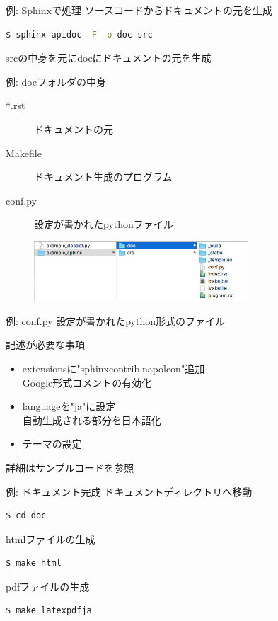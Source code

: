 \documentclass[12pt, xetex, xcolor=pdftex, dvipsnames]{beamer}
\begin{document}
\begin{frame}[fragile]{例: Sphinxで処理}
    ソースコードからドキュメントの元を生成

    \begin{lstlisting}[language=Bash]
$ sphinx-apidoc -F -o doc src
    \end{lstlisting}

    srcの中身を元にdocにドキュメントの元を生成
\end{frame}
\begin{frame}{例: docフォルダの中身}
    \begin{description}
        \item[*.rst] ドキュメントの元
        \item[Makefile] ドキュメント生成のプログラム
        \item[conf.py] 設定が書かれたpythonファイル
    \end{description}
    \begin{figure}
        \centering
        \includegraphics[width=8cm]{img/sphinx.png}
    \end{figure}
\end{frame}
\begin{frame}{例: conf.py}
    設定が書かれたpython形式のファイル

    \begin{block}{記述が必要な事項}
        \begin{itemize}
            \item extensionsに"sphinxcontrib.napoleon"追加\\
                Google形式コメントの有効化
            \item languageを"ja"に設定\\
                自動生成される部分を日本語化
            \item テーマの設定
        \end{itemize}
        詳細はサンプルコードを参照
    \end{block}
\end{frame}
\begin{frame}[fragile]{例: ドキュメント完成}
    ドキュメントディレクトリへ移動
    \begin{lstlisting}[language=Bash]
$ cd doc
    \end{lstlisting}

    htmlファイルの生成
    \begin{lstlisting}[language=Bash]
$ make html
    \end{lstlisting}

    pdfファイルの生成
    \begin{lstlisting}[language=Bash]
$ make latexpdfja
    \end{lstlisting}
\end{frame}
\end{document}
